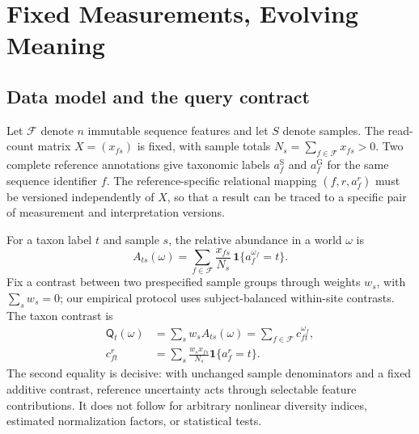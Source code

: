 \documentclass[conference]{IEEEtran}
\newcommand{\F}{\mathcal{F}}
\newcommand{\Q}{\mathsf{Q}}
\newcommand{\Sref}{\mathrm{S}}
\newcommand{\Gref}{\mathrm{G}}
\begin{document}
\section{Fixed Measurements, Evolving Meaning}
\label{sec:model}
\subsection{Data model and the query contract}
Let $\F$ denote $n$ immutable sequence features and let $S$ denote samples. The read-count matrix $X=(x_{fs})$ is fixed, with sample totals $N_s=\sum_{f\in\F}x_{fs}>0$. Two complete reference annotations give taxonomic labels $a_f^{\Sref}$ and $a_f^{\Gref}$ for the same sequence identifier $f$. The reference-specific relational mapping $(f,r,a_f^r)$ must be versioned independently of $X$, so that a result can be traced to a specific pair of measurement and interpretation versions.

For a taxon label $t$ and sample $s$, the relative abundance in a world $\omega$ is
\begin{equation}
 A_{ts}(\omega)=\sum_{f\in\F}\frac{x_{fs}}{N_s}\,\mathbf{1}\{a_f^{\omega_f}=t\}.
 \label{eq:abundance}
\end{equation}
Fix a contrast between two prespecified sample groups through weights $w_s$, with $\sum_s w_s=0$; our empirical protocol uses subject-balanced within-site contrasts. The taxon contrast is
\begin{equation}
\begin{aligned}
\Q_t(\omega)&=\sum_s w_s A_{ts}(\omega)=\sum_{f\in\F}c_{ft}^{\omega_f},\\
c_{ft}^r&=\sum_s\frac{w_s x_{fs}}{N_s}\mathbf{1}\{a_f^r=t\}.
\end{aligned}
\label{eq:contrast}
\end{equation}
The second equality is decisive: with unchanged sample denominators and a fixed additive contrast, reference uncertainty acts through selectable feature contributions. It does not follow for arbitrary nonlinear diversity indices, estimated normalization factors, or statistical tests.
\end{document}

